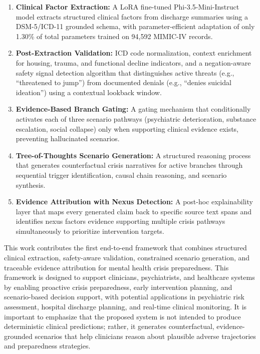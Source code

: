 \documentclass[conference]{IEEEtran}
\begin{document}
\begin{enumerate}
    \item \textbf{Clinical Factor Extraction:} A LoRA fine-tuned Phi-3.5-Mini-Instruct model extracts structured clinical factors from discharge summaries using a DSM-5/ICD-11 grounded schema, with parameter-efficient adaptation of only 1.30\% of total parameters trained on 94,592 MIMIC-IV records.
    
    \item \textbf{Post-Extraction Validation:} ICD code normalization, context enrichment for housing, trauma, and functional decline indicators, and a negation-aware safety signal detection algorithm that distinguishes active threats (e.g., ``threatened to jump'') from documented denials (e.g., ``denies suicidal ideation'') using a contextual lookback window.
    
    \item \textbf{Evidence-Based Branch Gating:} A gating mechanism that conditionally activates each of three scenario pathways (psychiatric deterioration, substance escalation, social collapse) only when supporting clinical evidence exists, preventing hallucinated scenarios.
    
    \item \textbf{Tree-of-Thoughts Scenario Generation:} A structured reasoning process that generates counterfactual crisis narratives for active branches through sequential trigger identification, causal chain reasoning, and scenario synthesis.
    
    \item \textbf{Evidence Attribution with Nexus Detection:} A post-hoc explainability layer that maps every generated claim back to specific source text spans and identifies nexus factors evidence supporting multiple crisis pathways simultaneously to prioritize intervention targets.
\end{enumerate}

This work contributes the first end-to-end framework that combines structured clinical extraction, safety-aware validation, constrained scenario generation, and traceable evidence attribution for mental health crisis preparedness. 
This framework is designed to support clinicians, psychiatrists, and healthcare systems by enabling proactive crisis preparedness, early intervention planning, and scenario-based decision support, with potential applications in psychiatric risk assessment, hospital discharge planning, and real-time clinical monitoring. It is important to emphasize that the proposed system is not intended to produce deterministic clinical predictions; rather, it generates counterfactual, evidence-grounded scenarios that help clinicians reason about plausible adverse trajectories and preparedness strategies.
\end{document}
